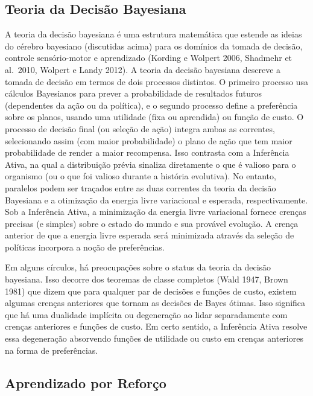 \documentclass[
  12pt,
]{book}
\begin{document}
\hypertarget{teoria-da-decisuxe3o-bayesiana}{%
\subsection{Teoria da Decisão Bayesiana}\label{teoria-da-decisuxe3o-bayesiana}}

A teoria da decisão bayesiana é uma estrutura matemática que estende as ideias do cérebro bayesiano (discutidas acima) para os domínios da tomada de decisão, controle sensório-motor e aprendizado (Kording e Wolpert 2006, Shadmehr et al.~2010, Wolpert e Landy 2012). A teoria da decisão bayesiana descreve a tomada de decisão em termos de dois processos distintos. O primeiro processo usa cálculos Bayesianos para prever a probabilidade de resultados futuros (dependentes da ação ou da política), e o segundo processo define a preferência sobre os planos, usando uma utilidade (fixa ou aprendida) ou função de custo. O processo de decisão final (ou seleção de ação) integra ambas as correntes, selecionando assim (com maior probabilidade) o plano de ação que tem maior probabilidade de render a maior recompensa. Isso contrasta com a Inferência Ativa, na qual a distribuição prévia sinaliza diretamente o que é valioso para o organismo (ou o que foi valioso durante a história evolutiva). No entanto, paralelos podem ser traçados entre as duas correntes da teoria da decisão Bayesiana e a otimização da energia livre variacional e esperada, respectivamente. Sob a Inferência Ativa, a minimização da energia livre variacional fornece crenças precisas (e simples) sobre o estado do mundo e sua provável evolução. A crença anterior de que a energia livre esperada será minimizada através da seleção de políticas incorpora a noção de preferências.

Em alguns círculos, há preocupações sobre o status da teoria da decisão bayesiana. Isso decorre dos teoremas de classe completos (Wald 1947, Brown 1981) que dizem que para qualquer par de decisões e funções de custo, existem algumas crenças anteriores que tornam as decisões de Bayes ótimas. Isso significa que há uma dualidade implícita ou degeneração ao lidar separadamente com crenças anteriores e funções de custo. Em certo sentido, a Inferência Ativa resolve essa degeneração absorvendo funções de utilidade ou custo em crenças anteriores na forma de preferências.

\hypertarget{aprendizado-por-reforuxe7o}{%
\subsection{Aprendizado por Reforço}\label{aprendizado-por-reforuxe7o}}
\end{document}
